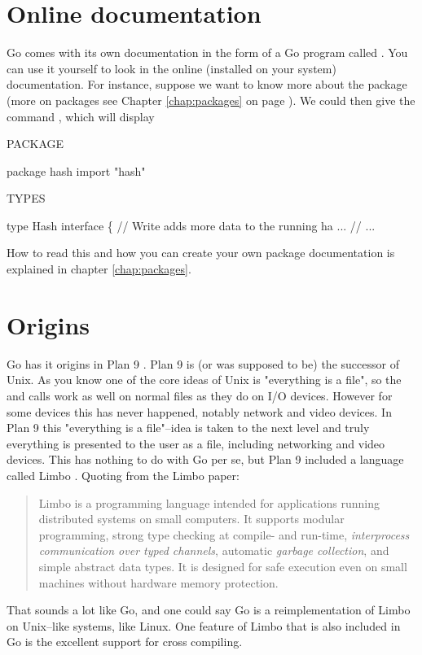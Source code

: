 \section{Online documentation}
Go comes with its own documentation in the form of a Go program called
. 
You can use it yourself to look
in the online (installed on your system) documentation. For
instance, suppose we want to know more about the package  
(more on packages see Chapter \ref{chap:packages} on page
\pageref{chap:packages}). We could then give the command
, which will display
\begin{display}
PACKAGE

package hash
import "hash"

TYPES

type Hash interface \{
    // Write adds more data to the running ha ...
    // ...
\end{display}
How to read this and how you can create your own package documentation
is explained in chapter \ref{chap:packages}.

\section{Origins}
Go has it origins in Plan 9 \cite{plan9}. Plan 9 is (or was 
supposed to be) the successor of Unix. As you know one of the
core ideas of Unix is "everything is a file", so the  and
 calls work as well on normal files as they do on I/O
devices. However for some devices this has never happened, notably
network and video devices. In Plan 9 this "everything is a file"--idea
is taken to the next level and truly everything is presented to the 
user as a file, including networking and video devices. This has nothing
to do with Go per se, but Plan 9 included a language called Limbo
\cite{limbo}. Quoting from the Limbo paper:
\begin{quote}
Limbo is a programming language intended for applications running
distributed systems on small computers. It supports modular programming,
strong type checking at compile- and run-time, \emph{interprocess
communication over typed channels}, automatic \emph{garbage collection}, and
simple abstract data types. It is designed for safe execution even on
small machines without hardware memory protection.
\end{quote}
That sounds a lot like Go, and one could say Go is a reimplementation of
Limbo on Unix--like systems, like Linux. One feature of Limbo that is
also included in Go is the excellent support for cross compiling.

